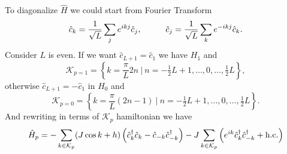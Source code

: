 To diagonalize $\hat{H}$ we could start from Fourier Transform
\begin{equation*}
	\hat{c}_k = \frac{1}{\sqrt{L}} \sum_j e^{i k j} \hat{c}_j,
	\hspace{10 mm} 
	\hat{c}_j = \frac{1}{\sqrt{L}} \sum_k e^{-i k j} \hat{c}_k.
\end{equation*}
Consider $L$ is even. If we want $\hat{c}_{L+1}= \hat{c}_1$ we have $H_1$ and
\begin{equation*}
	\mathcal K_{p=1} = \left\{
		k = \frac{\pi }{L}2n \ \big| \ n= - \tfrac{1}{2}L+1, \ldots, 0,\ldots,\tfrac{1}{2}L
	\right\},
\end{equation*}
otherwise $\hat{c}_{L+1} = - \hat{c}_1$ in $H_0$ and
\begin{equation*}
	\mathcal K_{p=0} = \left\{
		k =  \frac{ \pi }{L}(2n-1) \ \big| \  n= - \tfrac{1}{2}L+1, \ldots, 0,\ldots,\tfrac{1}{2}L
	\right\}.
\end{equation*}
And rewriting in terms of $\mathcal K_p$ hamiltonian we have
\begin{equation*}
	\hat{H}_{p} = -\sum_{k \in \mathcal K_p} (J \cos k + h) \left(
		\hat{c}^{\dag}_k \hat{c}_k - \hat{c}_{-k} \hat{c}^{\dag}_{-k}
	\right) - J \sum_{k \in \mathcal K_p} \left(e^{ik} \hat{c}_k^{\dag} \hat{c}_{-k}^{\dag} + \textnormal{h.c.} \right)
\end{equation*}
